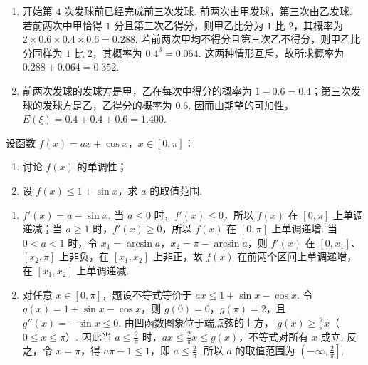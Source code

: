\begin{solution}
\begin{enumerate}
\item 开始第 \(4\) 次发球前已经完成前三次发球. 前两次由甲发球，第三次由乙发球. 若前两次中甲恰得 \(1\) 分且第三次乙得分，则甲乙比分为 \(1\) 比 \(2\)，其概率为
\(2\times0.6\times0.4\times0.6=0.288\). 若前两次甲均不得分且第三次乙不得分，则甲乙比分同样为 \(1\) 比 \(2\)，其概率为 \(0.4^{3}=0.064\). 这两种情形互斥，故所求概率为 \(0.288+0.064=0.352\).
\item 前两次发球的发球方是甲，乙在每次中得分的概率为 \(1-0.6=0.4\)；第三次发球的发球方是乙，乙得分的概率为 \(0.6\). 因而由期望的可加性，
\(E(\xi)=0.4+0.4+0.6=1.400\).
\end{enumerate}
\end{solution}

\begin{problem}
设函数 \(f(x) = ax + \cos x\)，\(x \in [0, \pi]\)：
\begin{enumerate}
\item 讨论 \( f(x) \) 的单调性；
\item 设 \( f(x) \leqslant 1 + \sin x \)，求 \( a \) 的取值范围.
\end{enumerate}
\end{problem}

\begin{solution}
\begin{enumerate}
\item \(f'(x)=a-\sin x\). 当 \(a\leqslant0\) 时，\(f'(x)\leqslant0\)，所以 \(f(x)\) 在 \([0,\pi]\) 上单调递减；当 \(a\geqslant1\) 时，\(f'(x)\geqslant0\)，所以 \(f(x)\) 在 \([0,\pi]\) 上单调递增. 当 \(0<a<1\) 时，令 \(x_1=\arcsin a\)，\(x_2=\pi-\arcsin a\)，则 \(f'(x)\) 在 \([0,x_1]\)、\([x_2,\pi]\) 上非负，在 \([x_1,x_2]\) 上非正，故 \(f(x)\) 在前两个区间上单调递增，在 \([x_1,x_2]\) 上单调递减.
\item 对任意 \(x\in[0,\pi]\)，题设不等式等价于
\(ax\leqslant 1+\sin x-\cos x\). 令 \(g(x)=1+\sin x-\cos x\)，则 \(g(0)=0\)，\(g(\pi)=2\)，且 \(g''(x)=-\sin x\leqslant0\). 由凹函数图象位于端点弦的上方，
\(g(x)\geqslant\frac{2}{\pi}x\)（\(0\leqslant x\leqslant\pi\)）. 因此当 \(a\leqslant\frac{2}{\pi}\) 时，\(ax\leqslant\frac{2}{\pi}x\leqslant g(x)\)，不等式对所有 \(x\) 成立. 反之，令 \(x=\pi\)，得 \(a\pi-1\leqslant1\)，即 \(a\leqslant\frac{2}{\pi}\). 所以 \(a\) 的取值范围为 \(\left(-\infty,\frac{2}{\pi}\right]\).
\end{enumerate}
\end{solution}

